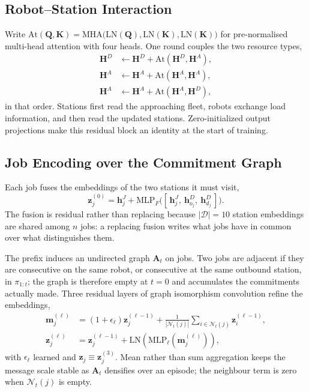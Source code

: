\subsection{Robot--Station Interaction}
\label{sec:arch-interaction}

Write $\mathrm{At}(\bm Q,\bm K)=\mathrm{MHA}\big(\mathrm{LN}(\bm Q),
\mathrm{LN}(\bm K),\mathrm{LN}(\bm K)\big)$ for pre-normalised multi-head
attention with four heads. One round couples the two resource types,
\begin{equation}
 \begin{aligned}
 \bm H^D &\leftarrow \bm H^D+\mathrm{At}(\bm H^D,\bm H^A),\\
 \bm H^A &\leftarrow \bm H^A+\mathrm{At}(\bm H^A,\bm H^A),\\
 \bm H^A &\leftarrow \bm H^A+\mathrm{At}(\bm H^A,\bm H^D),
 \end{aligned}
 \label{eq:interaction}
\end{equation}
in that order. Stations first read the approaching fleet, robots exchange
load information, and then read the updated stations. Zero-initialized output
projections make this residual block an identity at the start of training.

\subsection{Job Encoding over the Commitment Graph}
\label{sec:arch-jobs}

Each job fuses the embeddings of the two stations it must visit,
\begin{equation}
 \bm z^{(0)}_j=\bm h^J_j+
 \mathrm{MLP}_F\big([\,\bm h^J_j,\ \bm h^D_{o_j},\ \bm h^D_{d_j}\,]\big).
 \label{eq:fusion}
\end{equation}
The fusion is residual rather than replacing because $|\mathcal D|=10$
station embeddings are shared among $n$ jobs: a replacing fusion writes
what jobs have in common over what distinguishes them.

The prefix induces an undirected graph $\bm A_t$ on jobs. Two jobs are
adjacent if they are consecutive on the same robot, or consecutive at the
same outbound station, in $\pi_{1:t}$; the graph is therefore empty at $t=0$
and accumulates the commitments actually made. Three residual layers of graph
isomorphism convolution refine the embeddings,
\begin{equation}
 \begin{aligned}
 \bm m_j^{(\ell)}&=(1+\epsilon_\ell)\bm z_j^{(\ell-1)}
 +\frac{1}{|\mathcal N_t(j)|}
   \sum_{i\in\mathcal N_t(j)}\bm z_i^{(\ell-1)},\\
 \bm z_j^{(\ell)}&=\bm z_j^{(\ell-1)}+
 \mathrm{LN}\!\left(\mathrm{MLP}_\ell(\bm m_j^{(\ell)})\right),
 \end{aligned}
 \label{eq:gin}
\end{equation}
with $\epsilon_\ell$ learned and $\bm z_j\equiv\bm z^{(3)}_j$. Mean rather
than sum aggregation keeps the message scale stable as $\bm A_t$ densifies
over an episode; the neighbour term is zero when $\mathcal N_t(j)$ is empty.


